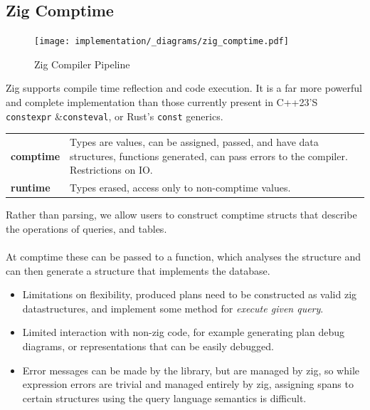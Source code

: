 \subsection{Zig Comptime}
\begin{figure}[h!]
    \centering
    \texttt{[image: implementation/\_diagrams/zig\_comptime.pdf]}
    \caption{Zig Compiler Pipeline}
\end{figure}
\noindent
Zig supports compile time reflection and code execution. It is a far more powerful and complete
implementation than those currently present in C++23'S \texttt{constexpr} \&\texttt{consteval},
or Rust's \texttt{const} generics.
\begin{center}
    \begin{tabular}{l p{}}
        \textbf{comptime} & Types are values, can be assigned, passed, and have data structures, functions generated, can pass errors to the compiler. Restrictions on IO. \\
        \textbf{runtime} & Types erased, access only to non-comptime values.                                                                                              \\
    \end{tabular}
\end{center}
Rather than parsing, we allow users to construct comptime structs that describe the operations of
queries, and tables.
\\
\\ At comptime these can be passed to a function, which analyses the structure and can then generate a structure that implements the database.
\begin{itemize}
    \setlength\itemsep{0em}
    \item Limitations on flexibility, produced plans need to be constructed as valid zig datastructures, and implement some method for \textit{execute given query}.
    \item Limited interaction with non-zig code, for example generating plan debug diagrams, or representations that can be easily debugged.
    \item Error messages can be made by the library, but are managed by zig, so while expression errors are trivial and managed entirely by zig, assigning spans to certain structures using the query language semantics is difficult.
\end{itemize}


